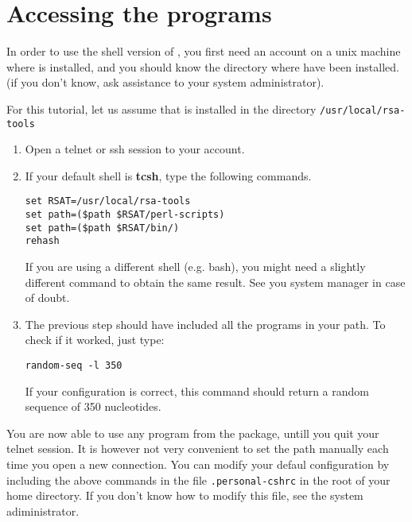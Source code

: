 
\section{Accessing the programs}

In order to use the shell version of \RSAT, you first need an account
on a unix machine where \RSAT is installed, and you should know the
directory where \RSAT have been installed. (if you don't know, ask
assistance to your system administrator).

For this tutorial, let us assume that \RSAT is installed in the
directory \texttt{/usr/local/rsa-tools}

\begin{enumerate}

\item Open a telnet or ssh session to your account.

\item If your default shell is \textbf{tcsh}, type the following
commands.

\begin{verbatim}
set RSAT=/usr/local/rsa-tools
set path=($path $RSAT/perl-scripts)
set path=($path $RSAT/bin/)
rehash
\end{verbatim}

If you are using a different shell (e.g. bash), you might need a
slightly different command to obtain the same result. See you system
manager in case of doubt.

\item The previous step should have included all the \RSAT programs in
your path.  To check if it worked, just type:

\begin{verbatim}
random-seq -l 350
\end{verbatim}

If your configuration is correct, this command should return a random
sequence of 350 nucleotides.

\end{enumerate}

You are now able to use any program from the \RSAT package, untill you
quit your telnet session. It is however not very convenient to set the
path manually each time you open a new connection. You can modify your
defaul configuration by including the above commands in the file
\texttt{.personal-cshrc} in the root of your home directory. If you
don't know how to modify this file, see the system adiministrator.
